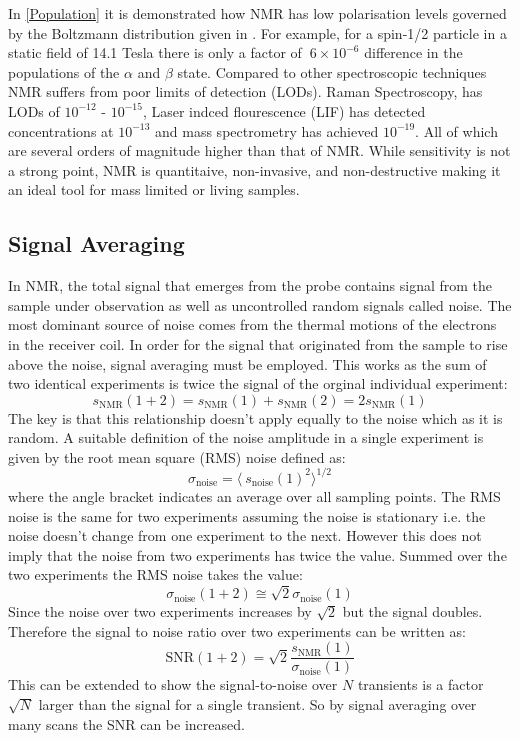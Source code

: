 In \ref{Population} it is demonstrated how NMR has low polarisation levels governed by the Boltzmann
 distribution given in . For example, for a spin-1/2 particle in a static field of 14.1 Tesla
 there is only a factor of $~6\times10^{-6}$ difference in the populations of the $\alpha$ and $\beta$ state.
 Compared to other spectroscopic techniques NMR suffers from poor limits of detection (LODs). Raman Spectroscopy, has
 LODs of $10^{-12}$ - $10^{-15}$, Laser indced flourescence (LIF) has detected concentrations at $10^{-13}$ and
 mass spectrometry has achieved $10^{-19}$. All of which are several orders of magnitude higher than that of NMR. While sensitivity is not a strong point, NMR is quantitaive, non-invasive, and non-destructive making it an ideal tool for mass limited or living samples.

 \subsection{Signal Averaging}\label{Signal Averaging}

 In NMR, the total signal that emerges from the probe contains signal from the sample
 under observation as well as uncontrolled random signals called noise. The most dominant source of noise comes from the thermal motions of the electrons
 in the receiver coil. In order for the signal that originated from the sample to rise above the noise,
 signal averaging must be employed. This works as the sum of two identical experiments is twice the signal
 of the orginal individual experiment:
 \begin{equation}
   s_\text{NMR}(1+2) = s_\text{NMR}(1) + s_\text{NMR}(2) = 2s_\text{NMR}(1)
 \end{equation}
 The key is that this relationship doesn't apply equally to the noise which as it is random. A suitable
 definition of the noise amplitude in a single experiment is given by the root mean square (RMS) noise defined
 as:
 \begin{equation}
   \sigma_\text{noise} = \langle~s_{\text{noise}}(1)^2\rangle^{1/2}
 \end{equation}
 where the angle bracket indicates an average over all sampling points. The RMS noise is the same for two
 experiments assuming the noise is stationary i.e. the noise doesn't change from one experiment to the next.
 However this does not imply that the noise from two experiments has twice the value. Summed over the two experiments
 the RMS noise takes the value:
 \begin{equation}
   \sigma_\text{noise}(1+2) \cong \sqrt{2} \sigma_{\text{noise}}(1)
 \end{equation}
 Since the noise over two experiments increases by $\sqrt{2}$ but the signal doubles. Therefore the signal to noise
 ratio over two experiments can be written as:
 \begin{equation}
   \text{SNR}(1+2) = \sqrt{2}\frac{s_{\text{NMR}}(1)}{\sigma_{\text{noise}}(1)}
 \end{equation}
 This can be extended to show the signal-to-noise over $N$ transients is a factor $\sqrt{N}$ larger than the
 signal for a single transient. So by signal averaging over many scans the SNR can be increased.

